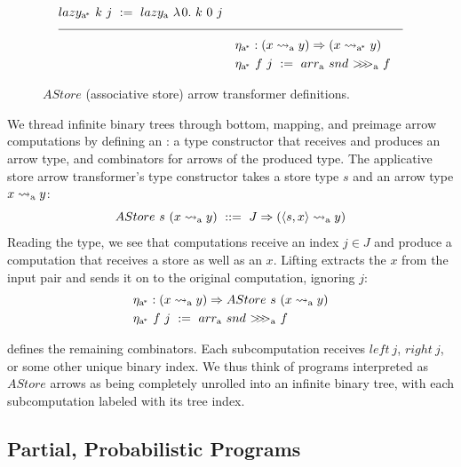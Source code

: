 \begin{figure}[!tb]
\begin{align*}
\begin{aligned}[t]
\begin{aligned}[t]
		&\arrowlazy\genc~k~j \ := \ \arrowlazy\gen~\fun{0}{k~0~j}
	\end{aligned} \\
\\[-8pt]
\hline
\\[-8pt]
	&\begin{aligned}[t]
		&\arrowtrans\genc : (x \arrow\gen y) \tto (x \arrow\genc y) \\
		&\arrowtrans\genc~f~j \ := \ \arrowarr\gen~snd~\arrowcomp\gen~f
	\end{aligned}
\end{aligned}
\end{align*}
\bottomhrule
\caption[Associative store arrow transformer]{$AStore$ (associative store) arrow transformer definitions.}
\label{fig:astore-arrow-defs}
\end{figure}

We thread infinite binary trees through bottom, mapping, and preimage arrow computations by defining an : a type constructor that receives and produces an arrow type, and combinators for arrows of the produced type.
The applicative store arrow transformer's type constructor takes a store type $s$ and an arrow type $x \rightsquigarrow_\mathrm{a} y$:
\begin{equation}
	AStore~s~(x \rightsquigarrow_\mathrm{a} y) \ ::= \ J \Rightarrow (\langle{s,x}\rangle \rightsquigarrow_\mathrm{a} y)
\end{equation}
Reading the type, we see that computations receive an index $j \in J$ and produce a computation that receives a store as well as an $x$.
Lifting extracts the $x$ from the input pair and sends it on to the original computation, ignoring $j$:
\begin{equation}
\begin{aligned}
	&\eta_\mathrm{a^{\mspace{-2mu}*}} : (x \rightsquigarrow_\mathrm{a} y) \Rightarrow AStore~s~(x \rightsquigarrow_\mathrm{a} y) \\
	&\eta_\mathrm{a^{\mspace{-2mu}*}}~f~j \ := \ arr_\mathrm{a}~snd~{>}\mspace{-6mu}{>}\mspace{-6mu}{>}_\mathrm{a}~f
\end{aligned}
\end{equation}

 defines the remaining combinators.
Each subcomputation receives $left~j$, $right~j$, or some other unique binary index.
We thus think of programs interpreted as $AStore$ arrows as being completely unrolled into an infinite binary tree, with each subcomputation labeled with its tree index.

\subsection{Partial, Probabilistic Programs}
\label{sec:probabilistic-programs}

